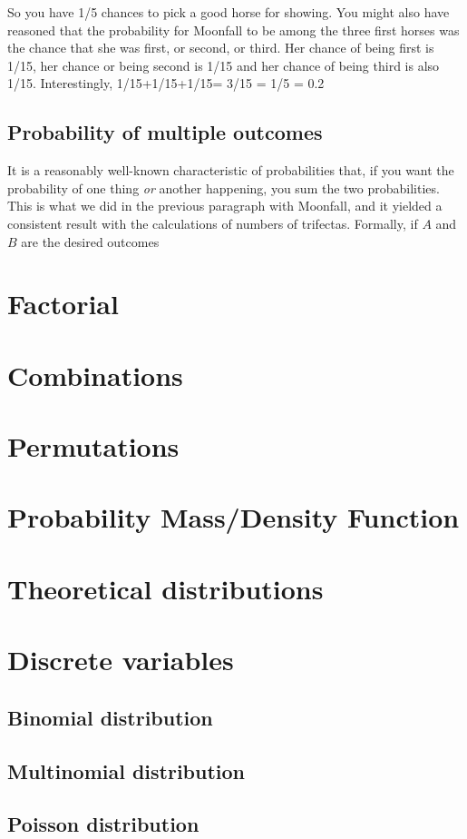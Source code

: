 \documentclass{report}
\begin{document}
	So you have 1/5 chances to pick a good horse for showing. You might also have reasoned that the probability for Moonfall to be among the three first horses was the chance that she was first, or second, or third. Her chance of being first is 1/15, her chance or being second is 1/15 and her chance of being third is also 1/15. Interestingly, 1/15+1/15+1/15= 3/15 = 1/5 = 0.2
	
	\subsection{Probability of multiple outcomes}
	It is a reasonably well-known characteristic of probabilities that, if you want the probability of one thing \emph{or} another happening, you sum the two probabilities. This is what we did in the previous paragraph with Moonfall, and it yielded a consistent result with the calculations of numbers of trifectas. Formally, if $A$ and $B$ are the desired outcomes
	
	\section{Factorial}
	\section{Combinations}
	\section{Permutations}
	\section{Probability Mass/Density Function}
	\section{Theoretical distributions}
	\section{Discrete variables}
		\subsection{Binomial distribution}
		\subsection{Multinomial distribution}
		\subsection{Poisson distribution}
\end{document}
